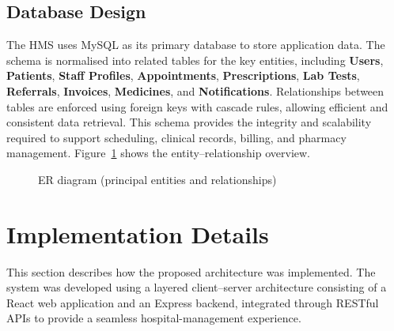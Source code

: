 \documentclass[12pt,a4paper]{report}
\begin{document}
\subsection{Database Design}
The HMS uses MySQL as its primary database to store application data. The schema is
normalised into related tables for the key entities, including \textbf{Users},
\textbf{Patients}, \textbf{Staff Profiles}, \textbf{Appointments},
\textbf{Prescriptions}, \textbf{Lab Tests}, \textbf{Referrals}, \textbf{Invoices},
\textbf{Medicines}, and \textbf{Notifications}. Relationships between tables are
enforced using foreign keys with cascade rules, allowing efficient and consistent data
retrieval. This schema provides the integrity and scalability required to support
scheduling, clinical records, billing, and pharmacy management. Figure~\ref{fig:er}
shows the entity--relationship overview.

\begin{figure}[htbp]
\centering
{}
\caption{ER diagram (principal entities and relationships)}
\label{fig:er}
\end{figure}

\section{Implementation Details}
This section describes how the proposed architecture was implemented. The system was
developed using a layered client--server architecture consisting of a React web
application and an Express backend, integrated through RESTful APIs to provide a
seamless hospital-management experience.
\end{document}
